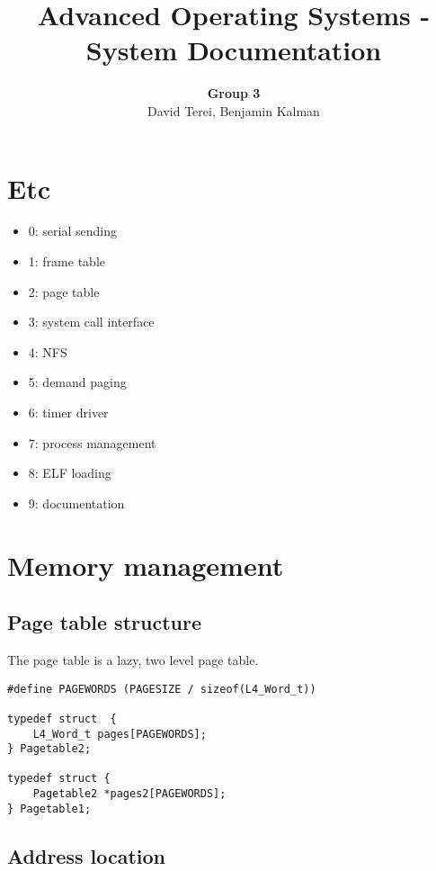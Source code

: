 \documentclass[12pt,english]{article}
\begin{document}

\title{Advanced Operating Systems - System Documentation}
\author{\textbf{Group 3} \\ David Terei, Benjamin Kalman}
\maketitle

\tableofcontents{}


\newpage{}
\section{Etc}

\begin{itemize}
\item 0: serial sending
\item 1: frame table
\item 2: page table
\item 3: system call interface
\item 4: NFS
\item 5: demand paging
\item 6: timer driver
\item 7: process management
\item 8: ELF loading
\item 9: documentation
\end{itemize}

\section{Memory management}

\subsection{Page table structure}

The page table is a lazy, two level page table.  

\begin{verbatim}
#define PAGEWORDS (PAGESIZE / sizeof(L4_Word_t))

typedef struct  {
	L4_Word_t pages[PAGEWORDS];
} Pagetable2;

typedef struct {
	Pagetable2 *pages2[PAGEWORDS];
} Pagetable1;
\end{verbatim}

\subsection{Address location}
\end{document}
